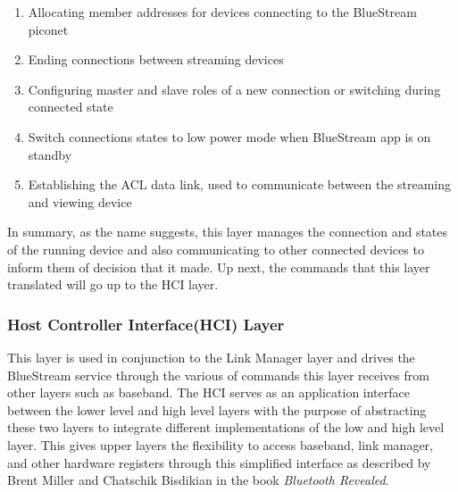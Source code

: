 \documentclass[a4paper,12pt]{article}
\begin{document}
\begin{enumerate}
\item Allocating member addresses for devices connecting to the BlueStream piconet
\item Ending connections between streaming devices
\item Configuring master and slave roles of a new connection or switching during connected state
\item Switch connections states to low power mode when BlueStream app is on standby
\item Establishing the ACL data link, used to communicate between the streaming and viewing device
\end{enumerate}

In summary, as the name suggests, this layer manages the connection and states of the running device and also communicating to other connected devices to inform them of decision that it made. Up next, the commands that this layer translated will go up to the HCI layer.

\subsubsection{Host Controller Interface(HCI) Layer}
This layer is used in conjunction to the Link Manager layer and drives the BlueStream service through the various of commands this layer receives from other layers such as baseband. The HCI serves as an application interface between the lower level and high level layers with the purpose of abstracting these two layers to integrate different implementations of the low and high level layer. This gives upper layers the flexibility to access baseband, link manager, and other hardware registers through this simplified interface as described by Brent Miller and Chatschik Bisdikian in the book \textit{Bluetooth Revealed}.
\end{document}
